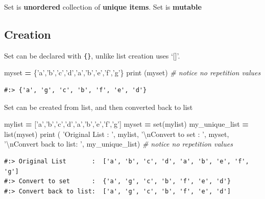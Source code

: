 \documentclass[
]{book}
\newenvironment{Shaded}{\begin{snugshade}}{\end{snugshade}}
\newcommand{\BuiltInTok}[1]{#1}
\newcommand{\CharTok}[1]{\textcolor[rgb]{0.5,0.5,0.5}{#1}}
\newcommand{\CommentTok}[1]{\textcolor[rgb]{0.37,0.37,0.37}{\textit{#1}}}
\newcommand{\NormalTok}[1]{#1}
\newcommand{\OperatorTok}[1]{\textcolor[rgb]{0.43,0.43,0.43}{\textbf{#1}}}
\newcommand{\StringTok}[1]{\textcolor[rgb]{0.5,0.5,0.5}{#1}}
\begin{document}
Set is \textbf{unordered} collection of \textbf{unique items}. Set is \textbf{mutable}

\hypertarget{creation}{%
\subsection{Creation}\label{creation}}

Set can be declared with \texttt{\{\}}, unlike list creation uses `{[}{]}'.

\begin{Shaded}
\begin{Highlighting}[]
\NormalTok{myset }\OperatorTok{=}\NormalTok{ \{}\StringTok{'a'}\NormalTok{,}\StringTok{'b'}\NormalTok{,}\StringTok{'c'}\NormalTok{,}\StringTok{'d'}\NormalTok{,}\StringTok{'a'}\NormalTok{,}\StringTok{'b'}\NormalTok{,}\StringTok{'e'}\NormalTok{,}\StringTok{'f'}\NormalTok{,}\StringTok{'g'}\NormalTok{\}}
\BuiltInTok{print}\NormalTok{ (myset) }\CommentTok{# notice no repetition values}
\end{Highlighting}
\end{Shaded}

\begin{verbatim}
#:> {'a', 'g', 'c', 'b', 'f', 'e', 'd'}
\end{verbatim}

Set can be created from list, and then converted back to list

\begin{Shaded}
\begin{Highlighting}[]
\NormalTok{mylist }\OperatorTok{=}\NormalTok{ [}\StringTok{'a'}\NormalTok{,}\StringTok{'b'}\NormalTok{,}\StringTok{'c'}\NormalTok{,}\StringTok{'d'}\NormalTok{,}\StringTok{'a'}\NormalTok{,}\StringTok{'b'}\NormalTok{,}\StringTok{'e'}\NormalTok{,}\StringTok{'f'}\NormalTok{,}\StringTok{'g'}\NormalTok{]}
\NormalTok{myset }\OperatorTok{=} \BuiltInTok{set}\NormalTok{(mylist)}
\NormalTok{my_unique_list }\OperatorTok{=} \BuiltInTok{list}\NormalTok{(myset)}
\BuiltInTok{print}\NormalTok{ (}
  \StringTok{'Original List       : '}\NormalTok{, mylist,}
  \StringTok{'}\CharTok{\textbackslash{}n}\StringTok{Convert to set      : '}\NormalTok{, myset,}
  \StringTok{'}\CharTok{\textbackslash{}n}\StringTok{Convert back to list: '}\NormalTok{, my_unique_list) }\CommentTok{# notice no repetition values}
\end{Highlighting}
\end{Shaded}

\begin{verbatim}
#:> Original List       :  ['a', 'b', 'c', 'd', 'a', 'b', 'e', 'f', 'g'] 
#:> Convert to set      :  {'a', 'g', 'c', 'b', 'f', 'e', 'd'} 
#:> Convert back to list:  ['a', 'g', 'c', 'b', 'f', 'e', 'd']
\end{verbatim}
\end{document}
